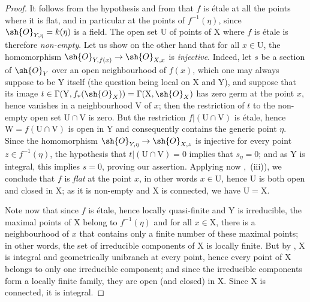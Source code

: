 \begin{proof}
It follows from the hypothesis and from  that $f$ is \'etale at all the points where it is flat, and in particular at the points of $f^{-1}(\eta)$, since $\sh{O}_{Y,\eta}=k(\eta)$ is a field.
The open set $\mathrm{U}$ of points of $\mathrm{X}$ where $f$ is \'etale is therefore \emph{non-empty}.
Let us show on the other hand that for all $x\in\mathrm{U}$, the homomorphism $\sh{O}_{Y,f(x)}\to\sh{O}_{X,x}$ is \emph{injective}.
Indeed, let $s$ be a section of $\sh{O}_Y$ over an open neighbourhood of $f(x)$, which one may always suppose to be $\mathrm{Y}$ itself (the question being local on $\mathrm{X}$ and $\mathrm{Y}$), and suppose that its image $t\in\Gamma(\mathrm{Y},f_*(\sh{O}_X))=\Gamma(\mathrm{X},\sh{O}_X)$ has zero germ at the point $x$, hence vanishes in a neighbourhood $\mathrm{V}$ of $x$; then the restriction of $t$ to the non-empty open set $\mathrm{U}\cap\mathrm{V}$ is zero. But the restriction $f|(\mathrm{U}\cap\mathrm{V})$ is \'etale, hence $\mathrm{W}=f(\mathrm{U}\cap\mathrm{V})$ is open in $\mathrm{Y}$ and consequently contains the generic point $\eta$. Since the homomorphism $\sh{O}_{Y,\eta}\to\sh{O}_{X,z}$ is injective for every point $z\in f^{-1}(\eta)$, the hypothesis that $t|(\mathrm{U}\cap\mathrm{V})=0$ implies that $s_\eta=0$; and as $\mathrm{Y}$ is integral, this implies $s=0$, proving our assertion.
Applying now ,~(iii)), we conclude that $f$ is \emph{flat} at the point $x$, in other words $x\in\mathrm{U}$, hence $\mathrm{U}$ is both open and closed in $\mathrm{X}$; as it is non-empty and $\mathrm{X}$ is connected, we have $\mathrm{U}=\mathrm{X}$.

Note now that since $f$ is \'etale, hence locally quasi-finite and $\mathrm{Y}$ is irreducible, the maximal points of $\mathrm{X}$ belong to $f^{-1}(\eta)$  and for all $x\in\mathrm{X}$, there is a neighbourhood of $x$ that contains only a finite number of these maximal points; in other words, the set of irreducible components of $\mathrm{X}$ is locally finite.
But by , $\mathrm{X}$ is integral and geometrically unibranch at every point, hence every point of $\mathrm{X}$ belongs to only one irreducible component; and since the irreducible components form a locally finite family, they are open (and closed) in $\mathrm{X}$. Since $\mathrm{X}$ is connected, it is integral.
\end{proof}

